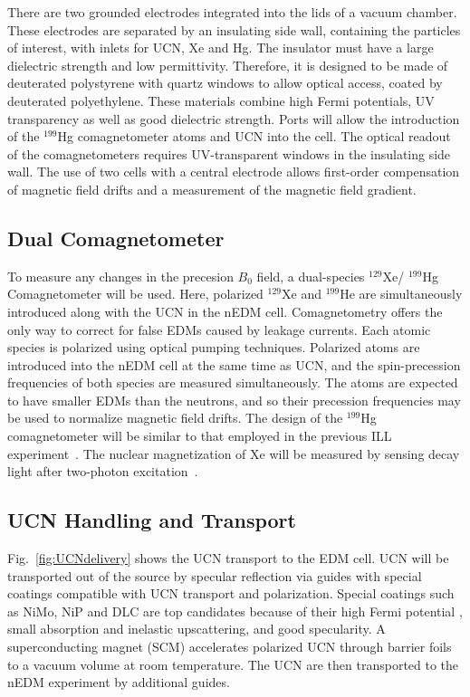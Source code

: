 There are two grounded electrodes integrated into the lids of a vacuum
chamber. These electrodes are separated by an insulating side wall,
containing the particles of interest, with inlets for UCN, Xe and
Hg. The insulator must have a large dielectric strength and low
permittivity. Therefore, it is designed to be made of deuterated
polystyrene with quartz windows to allow optical access, coated by
deuterated polyethylene. These materials combine high Fermi
potentials, UV transparency as well as good dielectric strength.
Ports will allow the introduction of the $^{199}$Hg comagnetometer
atoms and UCN into the cell. The optical readout of the
comagnetometers requires UV-transparent windows in the insulating side
wall. The use of two cells with a central electrode allows first-order
compensation of magnetic field drifts and a measurement of the
magnetic field gradient.


\subsection{Dual Comagnetometer}
To measure any changes in the precesion $B_0$ field, a dual-species
$^{129}$Xe/ $^{199}$Hg Comagnetometer will be used. Here, polarized
$^{129}$Xe and $^{199}$He are simultaneously introduced along with the
UCN in the nEDM cell. Comagnetometry offers the only way to correct
for false EDMs caused by leakage currents.  Each atomic species is
polarized using optical pumping techniques. Polarized atoms are
introduced into the nEDM cell at the same time as UCN, and the
spin-precession frequencies of both species are measured
simultaneously. The atoms are expected to have smaller EDMs than the
neutrons, and so their precession frequencies may be used to normalize
magnetic field drifts.  The design of the $^{199}$Hg comagnetometer
will be similar to that employed in the previous ILL
experiment~\cite{Baker2006,Griffith2009}. The nuclear magnetization of
Xe will be measured by sensing decay light after two-photon
excitation~\cite{momose2014development}.


\subsection{UCN Handling and Transport}
Fig.~\ref{fig:UCNdelivery} shows the UCN transport to the EDM cell.
UCN will be transported out of the source by specular reflection via
guides with special coatings compatible with UCN transport and
polarization. Special coatings such as NiMo, NiP and DLC are top
candidates because of their high Fermi potential , small absorption
and inelastic upscattering, and good specularity.  A superconducting
magnet (SCM) accelerates polarized UCN through barrier foils to a
vacuum volume at room temperature. The UCN are then transported to the
nEDM experiment by additional guides.



